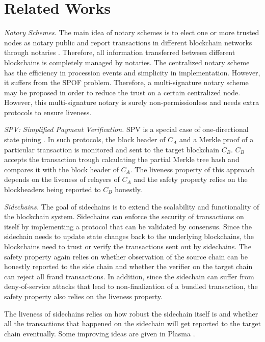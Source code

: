 \section{Related Works}
\label{chp:related-work}
\noindent
\emph{Notary Schemes.} The main idea of notary schemes is to elect one or more trusted nodes as notary public and report transactions in different blockchain networks through notaries \cite{qin2018overview}. Therefore, all information transferred between different blockchains is completely managed by notaries. The centralized notary scheme has the efficiency in procession events and simplicity in implementation. However, it suffers from the SPOF problem. Therefore, a multi-signature notary scheme may be proposed in order to reduce the trust on a certain centralized node. However, this multi-signature notary is surely non-permissionless and needs extra protocols to ensure liveness.

\smallskip\noindent\emph{SPV: Simplified Payment Verification.}
SPV \cite{lin2017survey,ray2020blwn} is a special case of one-directional state pining \cite{robinson2020merits}. In such protocols, the block header of $C_A$ and a Merkle proof of a particular transaction is monitored and sent to the target blockchain $C_B$. $C_B$ accepts the transaction trough calculating the partial Merkle tree hash and compares it with the block header of $C_A$. The liveness property of this approach depends on the liveness of relayers of $C_A$ and the safety property relies on the blockheaders being reported to $C_B$ honestly. 
    
\smallskip\noindent\emph{Sidechains.}
The goal of sidechains \cite{singh2020sidechain} is to extend the scalability and functionality of the blockchain system. Sidechains can enforce the security of transactions on itself by implementing a protocol that can be validated by consensus. Since the sidechain needs to update state changes back to the underlying blockchains, the blockchains need to trust or verify the transactions sent out by sidechains. The safety property again relies on whether observation of the source chain can be honestly reported to the side chain and whether the verifier on the target chain can reject all fraud transactions. In addition, since the sidechain can suffer from deny-of-service attacks that lead to non-finalization of a bundled transaction, the safety property also relies on the liveness property.

The liveness of sidechains relies on how robust the sidechain itself is and whether all the transactions that happened on the sidechain will get reported to the target chain eventually. Some improving ideas are given in Plasma \cite{poon2017plasma}.

